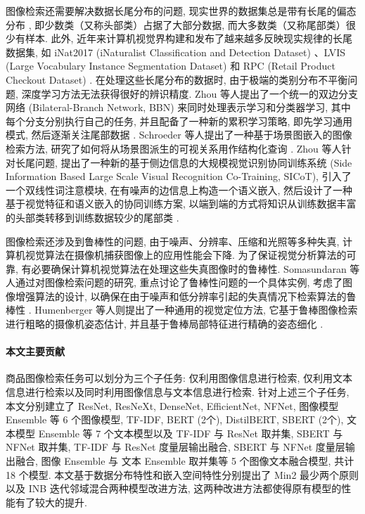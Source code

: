 \documentclass[12pt]{article}
\begin{document}
图像检索还需要解决数据长尾分布的问题, 现实世界的数据集总是带有长尾的偏态分布 \cite{Van2017Devil}, 即少数类（又称头部类）占据了大部分数据, 而大多数类（又称尾部类）很少有样本. 此外, 近年来计算机视觉界构建和发布了越来越多反映现实规律的长尾数据集, 如 iNat2017 (iNaturalist Classification and Detection Dataset) \cite{Van2018iNaturalist}、LVIS (Large Vocabulary Instance Segmentation Dataset) \cite{Gupta2019LVIS} 和 RPC (Retail Product Checkout Dataset) \cite{Wei2019RPC}. 在处理这些长尾分布的数据时, 由于极端的类别分布不平衡问题, 深度学习方法无法获得很好的辨识精度. 
Zhou 等人提出了一个统一的双边分支网络 (Bilateral-Branch Network, BBN) 来同时处理表示学习和分类器学习, 其中每个分支分别执行自己的任务, 并且配备了一种新的累积学习策略, 即先学习通用模式, 然后逐渐关注尾部数据 \cite{Zhou2020BBN}. Schroeder 等人提出了一种基于场景图嵌入的图像检索方法, 研究了如何将从场景图派生的可视关系用作结构化查询 \cite{Schroeder2020Structured}. Zhou 等人针对长尾问题, 提出了一种新的基于侧边信息的大规模视觉识别协同训练系统 (Side Information Based Large Scale Visual Recognition Co-Training, SICoT), 引入了一个双线性词注意模块, 在有噪声的边信息上构造一个语义嵌入, 然后设计了一种基于视觉特征和语义嵌入的协同训练方案, 以端到端的方式将知识从训练数据丰富的头部类转移到训练数据较少的尾部类 \cite{Zhou2020Large}. 

图像检索还涉及到鲁棒性的问题, 由于噪声、分辨率、压缩和光照等多种失真, 计算机视觉算法在摄像机捕获图像上的应用性能会下降. 为了保证视觉分析算法的可靠, 有必要确保计算机视觉算法在处理这些失真图像时的鲁棒性. Somasundaran 等人通过对图像检索问题的研究, 重点讨论了鲁棒性问题的一个具体实例, 考虑了图像增强算法的设计, 以确保在由于噪声和低分辨率引起的失真情况下检索算法的鲁棒性 \cite{Somasundaran2020Robust}.  Humenberger 等人则提出了一种通用的视觉定位方法, 它基于鲁棒图像检索进行粗略的摄像机姿态估计, 并且基于鲁棒局部特征进行精确的姿态细化 \cite{Humenberger2020Robust}. 

\paragraph{本文主要贡献} 商品图像检索任务可以划分为三个子任务: 仅利用图像信息进行检索, 仅利用文本信息进行检索以及同时利用图像信息与文本信息进行检索. 针对上述三个子任务, 本文分别建立了 ResNet, ResNeXt, DenseNet, EfficientNet, NFNet, 图像模型 Ensemble 等 6 个图像模型, TF-IDF, BERT (2个), DistilBERT, SBERT (2个), 文本模型 Ensemble 等 7 个文本模型以及 TF-IDF 与 ResNet 取并集, SBERT 与 NFNet 取并集, TF-IDF 与 ResNet 度量层输出融合, SBERT 与 NFNet 度量层输出融合, 图像 Ensemble 与 文本 Ensemble 取并集等 5 个图像文本融合模型, 共计 18 个模型. 本文基于数据分布特性和嵌入空间特性分别提出了 Min2 最少两个原则以及 INB 迭代邻域混合两种模型改进方法, 这两种改进方法都使得原有模型的性能有了较大的提升.
\end{document}
